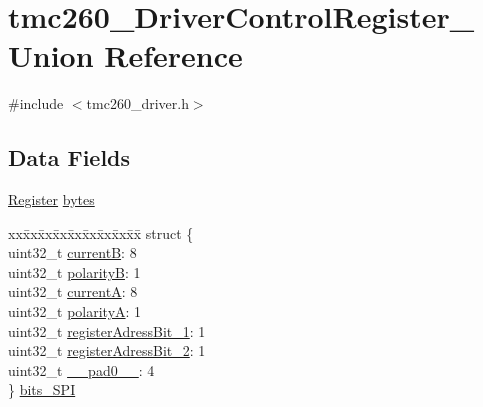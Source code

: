 \hypertarget{uniontmc260___driver_control_register__}{}\section{tmc260\+\_\+\+Driver\+Control\+Register\+\_\+ Union Reference}
\label{uniontmc260___driver_control_register__}


{\ttfamily \#include $<$tmc260\+\_\+driver.\+h$>$}

\subsection*{Data Fields}
\begin{DoxyCompactItemize}
\item 
\mbox{\hyperlink{tmc260__driver_8h_a280b01a3b5bb4294fcee278b00c030d6}{Register}} \mbox{\hyperlink{uniontmc260___driver_control_register___a445b72174063a88455cd86c22d77d03f}{bytes}}
\item 
\begin{tabbing}
xx\=xx\=xx\=xx\=xx\=xx\=xx\=xx\=xx\=\kill
struct \{\\
\>uint32\_t \mbox{\hyperlink{uniontmc260___driver_control_register___a177edbd550a5ff0e088fbcece0d3809c}{currentB}}: 8\\
\>uint32\_t \mbox{\hyperlink{uniontmc260___driver_control_register___a55b452b7f7fb24ad9e4c6889621dc18f}{polarityB}}: 1\\
\>uint32\_t \mbox{\hyperlink{uniontmc260___driver_control_register___a1d77364334a09c9a09c0fca76cfd46bf}{currentA}}: 8\\
\>uint32\_t \mbox{\hyperlink{uniontmc260___driver_control_register___ac15b029cb3900b8fd2136d1c1c3636ea}{polarityA}}: 1\\
\>uint32\_t \mbox{\hyperlink{uniontmc260___driver_control_register___a8e58d0701295971bc3d890f5107f8aa5}{registerAdressBit\_1}}: 1\\
\>uint32\_t \mbox{\hyperlink{uniontmc260___driver_control_register___abd6d1c957737511340b85f5c2d61f9ab}{registerAdressBit\_2}}: 1\\
\>uint32\_t \mbox{\hyperlink{uniontmc260___driver_control_register___a3e57c2ef1c3ffb36722f000cc1156824}{\_\_pad0\_\_}}: 4\\
\} \mbox{\hyperlink{uniontmc260___driver_control_register___a85ed15151e421184b09b639d9d53bf48}{bits\_SPI}}\\


\end{tabbing}
\end{DoxyCompactItemize}
